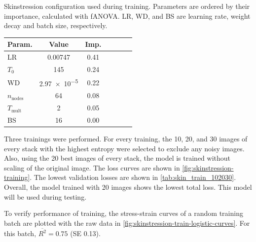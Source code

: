\begin{margintable}
    \centering
    \caption[Skinstression configuration]{
        Skinstression configuration used during training.
        Parameters are ordered by their importance, calculated with fANOVA.
        LR, WD, and BS are learning rate, weight decay and batch size, respectively.
    }
    \label{tab:conf_skin_final}
    \begin{tabular}{l c c c c c c}
        \toprule
        Param.               & Value         & Imp. \\
        \midrule
        {LR}                 & 0.00747       & 0.41 \\
        {$T_0$}              & 145           & 0.24 \\
        {WD}                 & \num{2.97e-5} & 0.22 \\
        {$n_\mathrm{nodes}$} & 64            & 0.08 \\
        {$T_\mathrm{mult}$}  & 2             & 0.05 \\
        {BS}                 & 16            & 0.00 \\
        \bottomrule
    \end{tabular}
\end{margintable}

Three trainings were performed.
For every training, the 10, 20, and 30 images of every stack with the highest entropy were selected to exclude any noisy images.
Also, using the 20 best images of every stack, the model is trained without scaling of the original image.
The loss curves are shown in \cref{fig:skinstression-training}.
The lowest validation losses are shown in \cref{tab:skin_train_102030}.
Overall, the model trained with 20 images shows the lowest total loss.
This model will be used during testing.

To verify performance of training, the stress-strain curves of a random training batch are plotted with the raw data in \cref{fig:skinstression-train-logistic-curves}.
For this batch, $\overline{R^2} = \num{0.75}$ (SE \num{0.13}).


